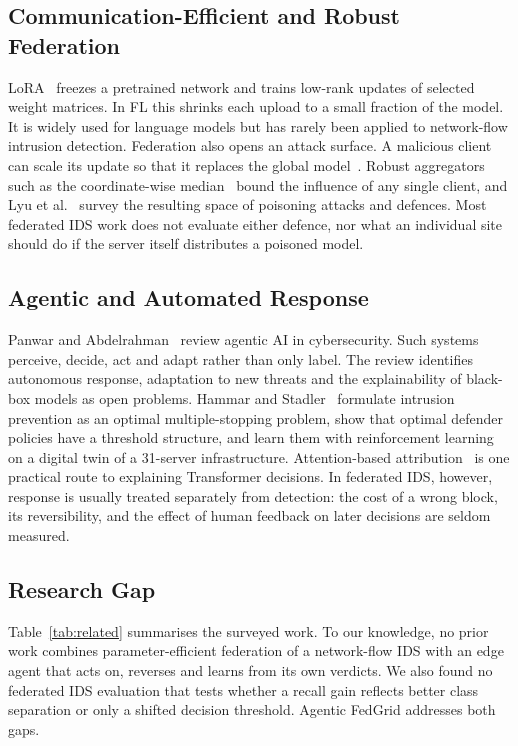 \documentclass[conference]{IEEEtran}
\begin{document}
\subsection{Communication-Efficient and Robust Federation}
LoRA~\cite{hu2022lora} freezes a pretrained network and trains low-rank
updates of selected weight matrices. In FL this shrinks each upload to a
small fraction of the model. It is widely used for language models but has
rarely been applied to network-flow intrusion detection. Federation also
opens an attack surface. A malicious client can scale its update so that it
replaces the global model~\cite{bagdasaryan2020}. Robust aggregators such as
the coordinate-wise median~\cite{yin2018} bound the influence of any single
client, and Lyu et al.~\cite{lyu2022} survey the resulting space of poisoning
attacks and defences. Most federated IDS work does not evaluate either
defence, nor what an individual site should do if the server itself
distributes a poisoned model.

\subsection{Agentic and Automated Response}
Panwar and Abdelrahman~\cite{panwar2025agentic} review agentic AI in
cybersecurity. Such systems perceive, decide, act and adapt rather than only
label. The review identifies autonomous response, adaptation to new threats
and the explainability of black-box models as open problems. Hammar and
Stadler~\cite{hammar2022} formulate intrusion prevention as an optimal
multiple-stopping problem, show that optimal defender policies have a
threshold structure, and learn them with reinforcement learning on a digital
twin of a 31-server infrastructure. Attention-based
attribution~\cite{abnar2020} is one practical route to explaining
Transformer decisions. In federated IDS, however, response is usually
treated separately from detection: the cost of a wrong block, its
reversibility, and the effect of human feedback on later decisions are
seldom measured.

\subsection{Research Gap}
Table~\ref{tab:related} summarises the surveyed work.
To our knowledge, no prior work combines parameter-efficient federation of a
network-flow IDS with an edge agent that acts on, reverses and learns from
its own verdicts. We also found no federated IDS evaluation that tests
whether a recall gain reflects better class separation or only a shifted
decision threshold. Agentic FedGrid addresses both gaps.
\end{document}
